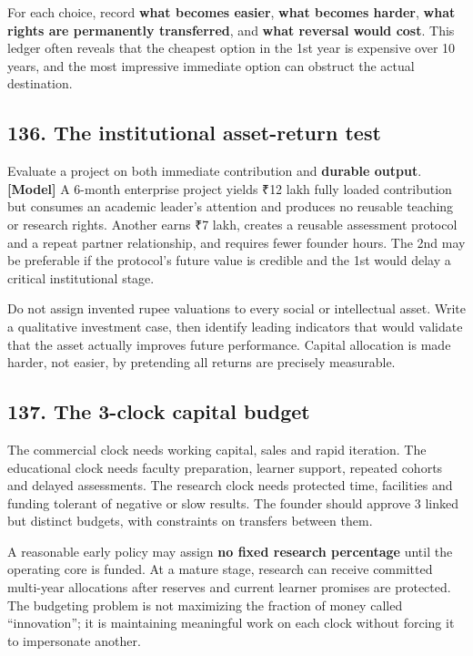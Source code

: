 For each choice, record \textbf{what becomes easier}, \textbf{what becomes harder}, \textbf{what rights are permanently transferred}, and \textbf{what reversal would cost}. This ledger often reveals that the cheapest option in the 1st year is expensive over 10 years, and the most impressive immediate option can obstruct the actual destination.

\subsection{136. The institutional asset-return test}

Evaluate a project on both immediate contribution and \textbf{durable output}. \textbf{[Model]} A 6-month enterprise project yields \textnormal{₹}12 lakh fully loaded contribution but consumes an academic leader's attention and produces no reusable teaching or research rights. Another earns \textnormal{₹}7 lakh, creates a reusable assessment protocol and a repeat partner relationship, and requires fewer founder hours. The 2nd may be preferable if the protocol's future value is credible and the 1st would delay a critical institutional stage.

Do not assign invented rupee valuations to every social or intellectual asset. Write a qualitative investment case, then identify leading indicators that would validate that the asset actually improves future performance. Capital allocation is made harder, not easier, by pretending all returns are precisely measurable.

\subsection{137. The 3-clock capital budget}

The commercial clock needs working capital, sales and rapid iteration. The educational clock needs faculty preparation, learner support, repeated cohorts and delayed assessments. The research clock needs protected time, facilities and funding tolerant of negative or slow results. The founder should approve 3 linked but distinct budgets, with constraints on transfers between them.

A reasonable early policy may assign \textbf{no fixed research percentage} until the operating core is funded. At a mature stage, research can receive committed multi-year allocations after reserves and current learner promises are protected. The budgeting problem is not maximizing the fraction of money called ``innovation''; it is maintaining meaningful work on each clock without forcing it to impersonate another.

